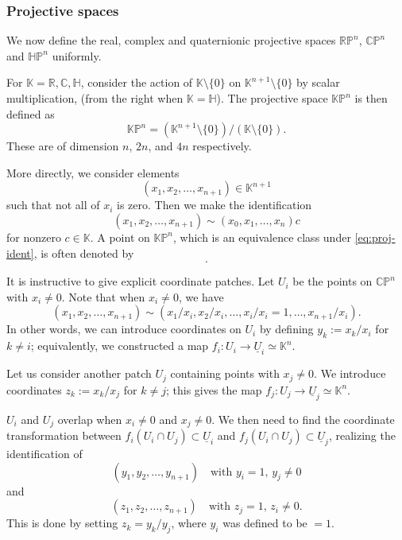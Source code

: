 \documentclass[12pt]{article}
\numberwithin{equation}{section}
\numberwithin{figure}{section}
\theoremstyle{remark}
\def\bC{\mathbb{C}}
\def\bH{\mathbb{H}}
\def\bK{\mathbb{K}}
\def\bR{\mathbb{R}}
\def\RP{\mathbb{RP}}
\def\CP{\mathbb{CP}}
\def\HP{\mathbb{HP}}
\def\KP{\mathbb{KP}}
\begin{document}
\subsubsection{Projective spaces}
We now define the real, complex and quaternionic projective spaces $\RP^n$, $\CP^n$ and $\HP^n$ uniformly.
\begin{example}
  \label{ex:proj}
  For $\bK=\bR,\bC,\bH$, 
  consider the action of $\bK\setminus \{0\}$ on
  $\bK^{n+1}\setminus\{0\}$ by scalar multiplication, (from the right when $\bK=\bH$).
  The projective space $\KP^n$ is then defined as
  \begin{equation}
    \KP^n = (\bK^{n+1}\setminus\{0\})/(\bK\setminus\{0\}).
  \end{equation}
  These are of dimension $n$, $2n$, and $4n$ respectively.
\end{example}
More directly, we consider elements 
\begin{equation}
(x_1,x_2,\ldots,x_{n+1})\in \bK^{n+1}
\end{equation} such that not all of $x_i$ is zero.
Then we make the identification \begin{equation}
  (x_1,x_2,\ldots,x_{n+1}) \sim  ( x_0, x_1, \ldots,  x_n)c \label{eq:proj-ident}
\end{equation} for nonzero $c\in \bK$.
A point on $\KP^n$,
which is an equivalence class under \eqref{eq:proj-ident},
is often denoted by \begin{equation}
  [x_1:x_2:\cdots:x_{n+1}].
\end{equation}


It is instructive to give explicit coordinate patches.
Let $U_i$ be the points on $\CP^n$ with $x_i\neq 0$.
Note that when $x_i\neq 0$, we have \begin{equation}
  (x_1,x_2,\ldots,x_{n+1}) \sim (x_1/x_i, x_2/x_i, \ldots, x_i/x_i=1, \ldots, x_{n+1}/x_i).
\end{equation} 
In other words, we can introduce coordinates on $U_i$ by defining  $y_k:=x_k/x_i$ for $k\neq i$;
equivalently, we constructed a map $f_i: U_i \to \underline{U}_i \simeq \bK^n$.

Let us consider another patch $U_j$ containing points with $x_j\neq 0$. 
We introduce coordinates $z_k:=x_k/x_j$ for $k\neq j$;
this gives the map $f_j: U_j \to \underline{U}_j\simeq \bK^n$.

$U_i$ and $U_j$ overlap when $x_i\neq 0$ and $x_j\neq 0$.
We then need to find the coordinate transformation 
between $f_i(U_i \cap U_j )\subset \underline{U}_i$
and $f_j(U_i \cap U_j) \subset \underline{U}_j$, realizing the identification of
\begin{equation}
  (y_1,y_2,\ldots,y_{n+1}) \quad \text{with $y_i=1$, $y_j\neq 0$}
\end{equation} and 
\begin{equation}
  (z_1,z_2,\ldots,z_{n+1}) \quad \text{with $z_j=1$, $z_i\neq 0$}.
\end{equation}
This is done by setting $z_k = y_k / y_j$, where $y_i$ was defined to be $=1$.
\end{document}
